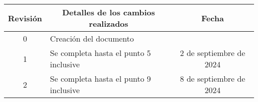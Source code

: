 \begin{table}[ht]
	\label{tab:registro}
	\centering
	\begin{tabularx}{\linewidth}{@{}|c|X|c|@{}}
		\hline
		\rowcolor[HTML]{C0C0C0}
		Revisión 	& \multicolumn{1}{c|}{\cellcolor[HTML]{C0C0C0}Detalles de los cambios realizados} 	& Fecha                       \\ \hline
		0        	& Creación del documento                                                          	& \fechaInicioName            \\ \hline
		1        	& Se completa hasta el punto 5 inclusive                                          	& {2} de {septiembre} de 2024 \\ \hline
		2      		& Se completa hasta el punto 9 inclusive											& {8} de {septiembre} de 2024 \\ \hline

	\end{tabularx}
\end{table}